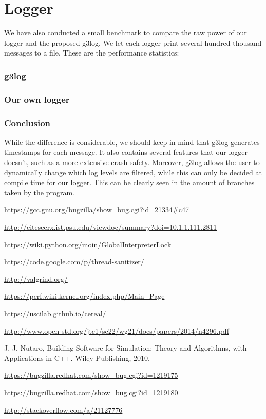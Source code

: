 \documentclass[8pt,a4paper]{report}
\begin{document}
\section{Logger}
We have also conducted a small benchmark to compare the raw power of our logger and the proposed g3log.
We let each logger print several hundred thousand messages to a file. These are the performance statistics:
\subsubsection{g3log}

\subsubsection{Our own logger}

\subsubsection{Conclusion}
While the difference is considerable, we should keep in mind that g3log generates timestamps for each message. It also contains several features that our logger doesn't, such as a more extensive crash safety. Moreover, g3log allows the user to dynamically change which log levels are filtered, while this can only be decided at compile time for our logger. This can be clearly seen in the amount of branches taken by the program.

\begin{thebibliography}{1}


   \url{https://gcc.gnu.org/bugzilla/show_bug.cgi?id=21334#c47}

   \url{http://citeseerx.ist.psu.edu/viewdoc/summary?doi=10.1.1.111.2811}
  
   \url{https://wiki.python.org/moin/GlobalInterpreterLock}
  
   \url{https://code.google.com/p/thread-sanitizer/}
  
   \url{http://valgrind.org/}
  
   \url{https://perf.wiki.kernel.org/index.php/Main_Page}
  
   \url{https://uscilab.github.io/cereal/}
  
   \url{http://www.open-std.org/jtc1/sc22/wg21/docs/papers/2014/n4296.pdf}
  
    J. J. Nutaro, Building Software for Simulation: Theory and Algorithms, with
Applications in C++. Wiley Publishing, 2010.

    \url{https://bugzilla.redhat.com/show_bug.cgi?id=1219175}
  
    \url{https://bugzilla.redhat.com/show_bug.cgi?id=1219180}

   \url{http://stackoverflow.com/a/21127776}

  \end{thebibliography}
\end{document}
